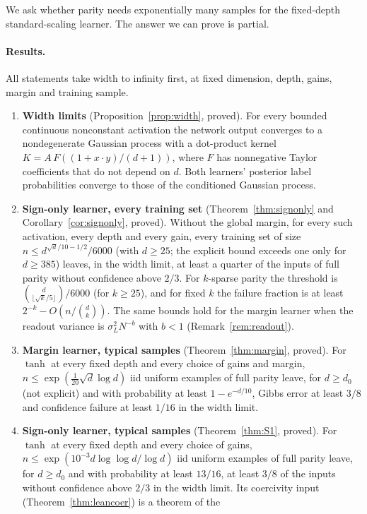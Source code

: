 \documentclass[11pt]{article}
\theoremstyle{definition}\newtheorem{assumption}[theorem]{Assumption}
\theoremstyle{remark}\newtheorem{remark}[theorem]{Remark}
\begin{document}
We ask whether parity needs exponentially many samples for the fixed-depth
standard-scaling learner. The answer we can prove is partial.

\paragraph{Results.} All statements take width to infinity first, at fixed
dimension, depth, gains, margin and training sample.
\begin{enumerate}
\item \textbf{Width limits} (Proposition~\ref{prop:width}, proved). For
every bounded continuous nonconstant activation the network output
converges to a nondegenerate Gaussian process with a dot-product kernel
$K=A\,F((1+x\cdot y)/(d+1))$, where $F$ has nonnegative Taylor coefficients
that do not depend on $d$. Both learners' posterior label probabilities
converge to those of the conditioned Gaussian process.
\item \textbf{Sign-only learner, every training set}
(Theorem~\ref{thm:signonly} and Corollary~\ref{cor:signonly}, proved).
Without the global margin, for every such activation, every depth and every
gain, every training set of size
$n\le d^{\sqrt d/10-1/2}/6000$ (with $d\ge25$; the explicit bound exceeds
one only for $d\ge385$) leaves, in the width limit, at least a quarter of the inputs of
full parity without confidence above $2/3$. For $k$-sparse parity the
threshold is $\binom d{\lfloor\sqrt k/5\rfloor}/6000$ (for $k\ge25$), and for fixed $k$
the failure fraction is at least $2^{-k}-O(n/\binom dk)$. The same bounds
hold for the margin learner when the readout variance is $\sigma_L^2N^{-b}$
with $b<1$ (Remark~\ref{rem:readout}).
\item \textbf{Margin learner, typical samples} (Theorem~\ref{thm:margin},
proved). For $\tanh$ at every fixed depth and every choice of gains and
margin, $n\le\exp(\frac1{20}\sqrt d\log d)$ iid uniform examples of full
parity leave, for $d\ge d_0$ (not explicit) and with probability at least $1-e^{-d/10}$, Gibbs error at least
$3/8$ and confidence failure at least $1/16$ in the width limit.
\item \textbf{Sign-only learner, typical samples} (Theorem~\ref{thm:S1},
proved). For $\tanh$ at every fixed depth and every choice of gains,
$n\le\exp(10^{-3}d\log\log d/\log d)$ iid uniform examples of full parity
leave, for $d\ge d_0$ and with probability at least $13/16$, at least
$3/8$ of the inputs without confidence above $2/3$ in the width limit. Its
coercivity input (Theorem~\ref{thm:leancoer}) is a theorem of the

\end{enumerate}
\end{document}
